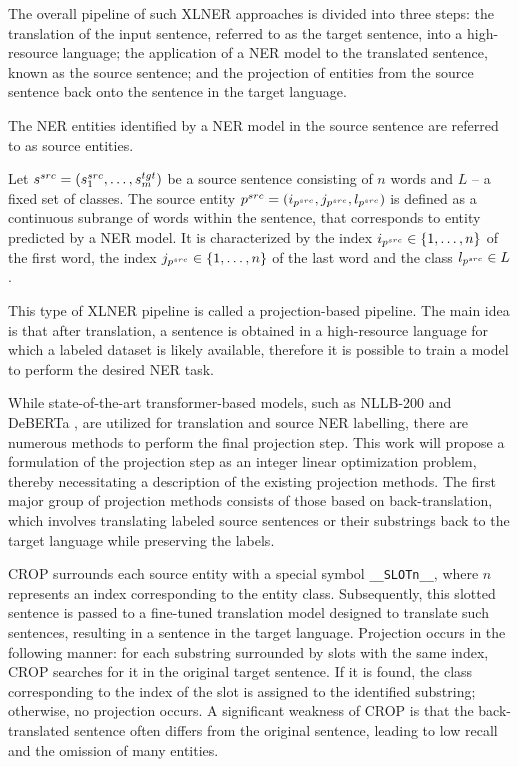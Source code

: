 The overall pipeline of such XLNER approaches is divided into
three steps: the translation of the input sentence, referred to as the target sentence, into a
high-resource language; the application of a NER model to the translated
sentence, known as the source sentence; and the projection of entities from the source sentence
back onto the sentence in the target language.

The NER entities identified by a NER model in the source sentence are referred to as source entities.
\begin{definition}
  Let \( s^{src} = \left( s_1^{src}, \dots, s_m^{tgt} \right) \) be a source sentence consisting of \( n \) words
  and \( L \) -- a fixed set of classes.
  The source entity \( p^{src} = (i_{p^{src}}, j_{p^{src}}, l_{p^{src}} ) \) is defined as a continuous
  subrange of words within the sentence, that corresponds to entity predicted by a NER model. It is
  characterized by the index \( i_{p^{src}} \in \{ 1, \dots, n \} \) of the first
  word, the index \( j_{p^{src}} \in \{ 1, \dots, n \} \) of the last word and the class \( l_{p^{src}} \in L \).
\end{definition}

This type of XLNER pipeline is called a projection-based pipeline. The main idea is that after
translation, a sentence is obtained in a high-resource language for which a labeled dataset is
likely available, therefore it is possible to train a model to perform the desired NER task.

While state-of-the-art transformer-based models, such as NLLB-200 \cite{nllbteam2022languageleftbehindscaling}
and DeBERTa \cite{He2020DeBERTaDB,He2021DeBERTaV3ID}, are utilized for translation and source NER labelling,
there are numerous methods to perform the final projection step. This work will propose a formulation
of the projection step as an integer linear optimization problem, thereby necessitating a description
of the existing projection methods. The first major group of projection methods consists of those based
on back-translation, which involves translating labeled source sentences or their substrings back to the
target language while preserving the labels.

CROP \cite{yang-etal-2022-crop} surrounds each source entity with a special symbol \texttt{\_\_SLOT{n}\_\_},
where \( n \) represents an index corresponding to the entity class. Subsequently, this slotted sentence
is passed to a fine-tuned translation model designed to translate such sentences, resulting in a
sentence in the target language. Projection occurs in the following manner: for each substring
surrounded by slots with the same index, CROP searches for it in the original target sentence. If it
is found, the class corresponding to the index of the slot is assigned to the identified substring;
otherwise, no projection occurs. A significant weakness of CROP is that the back-translated sentence
often differs from the original sentence, leading to low recall and the omission of many entities.

